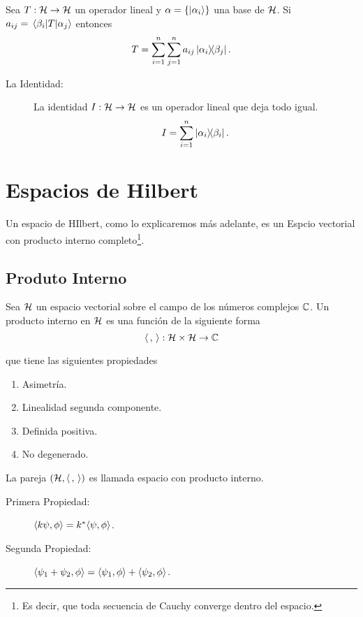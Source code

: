 \begin{teorema}
	Sea $T:\mathcal{H} \to \mathcal{H}$ un operador lineal y $\alpha = \{ \ket{\alpha _i} \}$ una base de $\mathcal{H}$. Si $a_{ij} = \mel{\beta _i}{T}{\alpha _j}$ entonces
		$$ T = \sum_{i=1} ^n \sum _{j=1} ^n a_{ij} \ketbra{\alpha _i}{\beta _j}. $$
\end{teorema}


\begin{description}
	\item[La Identidad: ] La identidad $I:\mathcal{H} \to \mathcal{H}$ es un operador lineal que deja todo igual.
		$$ I = \sum_{i=1} ^n \ketbra{\alpha _i}{\beta _i}. $$
\end{description}



\section{Espacios de Hilbert}
Un espacio de HIlbert, como lo explicaremos más adelante, es un Espcio vectorial con producto interno completo\footnote{Es decir, que toda secuencia de Cauchy converge dentro del espacio.}.

\subsection{Produto Interno}
Sea $\mathcal{H}$ un espacio vectorial sobre el campo de los números complejos $\mathbb{C}$. Un producto interno en $\mathcal{H}$ es una función de la siguiente forma
	$$ \langle \, , \, \rangle: \mathcal{H} \times \mathcal{H} \to \mathbb{C} $$

que tiene las siguientes propiedades
\begin{enumerate}
	\item Asimetría.
	\item Linealidad segunda componente.
	\item Definida positiva.
	\item No degenerado.
\end{enumerate}
La pareja $\qty(\mathcal{H} ,\langle \, , \, \rangle)$ es llamada espacio con producto interno. 
\begin{description}
	\item[Primera Propiedad: ] $\langle k\psi , \phi \rangle = k^* \langle \psi , \phi \rangle$.
	\item[Segunda Propiedad: ] $\langle \psi _1 + \psi _2 , \phi \rangle = \langle \psi _1 , \phi \rangle + \langle \psi _2 , \phi \rangle$.
\end{description}

